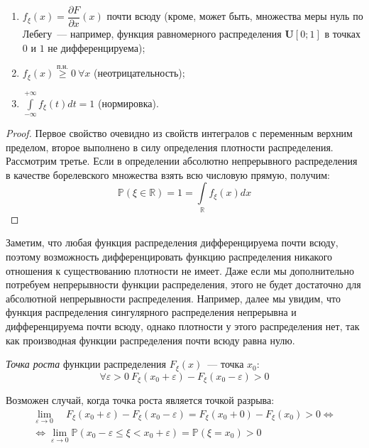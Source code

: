 \begin{namedthm}\leavevmode
\begin{enumerate}
    \item $f_{\xi}(x) = \dfrac{\partial{F}}{\partial{x}}(x)$ почти всюду (кроме, может быть, множества меры нуль по Лебегу~--- например, функция равномерного распределения $\mathbf{U}[0;1]$ в точках $0$ и $1$ не дифференцируема);
    \item $f_\xi(x) \overset{\text{п.н.}}{\geqslant} 0~ \forall x$ (неотрицательность);
    \item $\int\limits_{-\infty}^{+\infty} f_\xi(t) dt = 1$ (нормировка).
\end{enumerate}
\end{namedthm}
\begin{proof}
    Первое свойство очевидно из свойств интегралов с переменным верхним пределом, второе выполнено в силу определения плотности распределения. Рассмотрим третье. Если в определении абсолютно непрерывного распределения в качестве борелевского множества взять всю числовую прямую, получим: 
    \begin{equation*}
        \mathbb{P}(\xi \in \mathbb{R})=1=\int\limits_{\mathbb{R}} f_{\xi}(x) dx
    \end{equation*}
\end{proof}

\begin{rmrk}
     Заметим, что любая функция распределения дифференцируема почти всюду, поэтому возможность дифференцировать функцию распределения никакого отношения к существованию плотности не имеет. Даже если мы дополнительно потребуем непрерывности функции распределения, этого не будет достаточно для абсолютной непрерывности распределения. Например, далее мы увидим, что функция распределения сингулярного распределения непрерывна и дифференцируема почти всюду, однако плотности у этого распределения нет, так как производная функции распределения почти всюду равна нулю.
\end{rmrk}

\begin{defn}
    {\it Точка роста} функции распределения $F_\xi(x)$~--- точка $x_0$:
\begin{equation*}
    \forall \varepsilon > 0~ F_\xi(x_0 + \varepsilon) - F_\xi(x_0 - \varepsilon) > 0
\end{equation*}
\end{defn}

\begin{rmrk}
    Возможен случай, когда точка роста является точкой разрыва:
    \begin{multline*}
    \lim _{\varepsilon \to 0} \quad F_{\xi}\left(x_{0}+\varepsilon\right)-F_{\xi}\left(x_{0}-\varepsilon\right)=F_{\xi}\left(x_{0}+0\right)-F_{\xi}\left(x_{0}\right)>0 \Leftrightarrow \\
    \Leftrightarrow \lim_{\varepsilon \to 0}\mathbb{P}\left(x_{0}-\varepsilon \leqslant \xi<x_{0}+\varepsilon\right)=\mathbb{P}\left(\xi=x_{0}\right)>0
    \end{multline*}
\end{rmrk}

